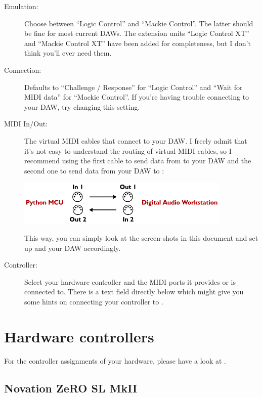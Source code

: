 \begin{description}
\item[Emulation:] Choose between ``Logic Control'' and ``Mackie
  Control''.  The latter should be fine for most current DAWs.  The
  extension units ``Logic Control XT'' and ``Mackie Control XT'' have
  been added for completeness, but I don't think you'll ever need
  them.

\item[Connection:] Defaults to ``Challenge / Response'' for ``Logic
  Control'' and ``Wait for MIDI data'' for ``Mackie Control''.  If
  you're having trouble connecting to your DAW, try changing this
  setting.

\item[MIDI In/Out:] The virtual MIDI cables that connect
   to your DAW.  I freely admit that it's not
  easy to understand the routing of virtual MIDI cables, so I
  recommend using the first cable to send data from
   to your DAW and the second one to send data
  from your DAW to :

  \includegraphics[scale=\screenshotscale,clip]{include/images/virtual_midi_cables.png}

  This way, you can simply look at the screen-shots in this document
  and set up  and your DAW accordingly.

\item[Controller:] Select your hardware controller and the MIDI ports
  it provides or is connected to.  There is a text field directly
  below which might give you some hints on connecting your controller
  to .

\end{description}

\chapter{Hardware controllers}
\label{chap:controller_setup}

For the controller assignments of your hardware, please have a look at
.

\section{Novation ZeRO SL MkII}

